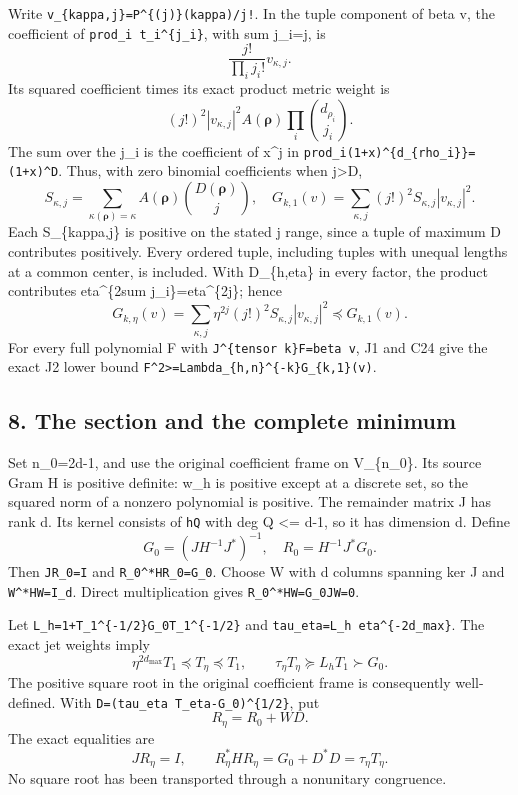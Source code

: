 Write \texttt{v\_\{kappa,j\}=P\^{}\{(j)\}(kappa)/j!}. In the tuple component of beta v, the coefficient of \texttt{prod\_i\ t\_i\^{}\{j\_i\}}, with sum j\_i=j, is \[
\frac{j!}{\prod_i j_i!}v_{\kappa,j}.
\] Its squared coefficient times its exact product metric weight is \[
(j!)^2 |v_{\kappa,j}|^2 A(\boldsymbol\rho)
 \prod_i\binom{d_{\rho_i}}{j_i}.
\] The sum over the j\_i is the coefficient of x\^{}j in \texttt{prod\_i(1+x)\^{}\{d\_\{rho\_i\}\}=(1+x)\^{}D}. Thus, with zero binomial coefficients when j\textgreater D, \[
S_{\kappa,j}=\sum_{\kappa(\boldsymbol\rho)=\kappa}
A(\boldsymbol\rho)\binom{D(\boldsymbol\rho)}j,
\quad
G_{k,1}(v)=\sum_{\kappa,j}(j!)^2S_{\kappa,j}|v_{\kappa,j}|^2.
\tag{C24}
\] Each S\_\{kappa,j\} is positive on the stated j range, since a tuple of maximum D contributes positively. Every ordered tuple, including tuples with unequal lengths at a common center, is included. With D\_\{h,eta\} in every factor, the product contributes eta\^{}\{2sum j\_i\}=eta\^{}\{2j\}; hence \[
G_{k,\eta}(v)=\sum_{\kappa,j}\eta^{2j}(j!)^2S_{\kappa,j}|v_{\kappa,j}|^2
\preceq G_{k,1}(v).
\tag{C25}
\] For every full polynomial F with \texttt{J\^{}\{tensor\ k\}F=beta\ v}, J1 and C24 give the exact J2 lower bound \texttt{\textbar{}\textbar{}F\textbar{}\textbar{}\^{}2\textgreater{}=Lambda\_\{h,n\}\^{}\{-k\}G\_\{k,1\}(v)}.

\subsection{8. The section and the complete minimum}\label{mrcoerc:the-section-and-the-complete-minimum}

Set n\_0=2d-1, and use the original coefficient frame on V\_\{n\_0\}. Its source Gram H is positive definite: w\_h is positive except at a discrete set, so the squared norm of a nonzero polynomial is positive. The remainder matrix J has rank d. Its kernel consists of \texttt{hQ} with deg Q \textless= d-1, so it has dimension d. Define \[
G_0=(JH^{-1}J^*)^{-1},\quad R_0=H^{-1}J^*G_0.
\] Then \texttt{JR\_0=I} and \texttt{R\_0\^{}*HR\_0=G\_0}. Choose W with d columns spanning ker J and \texttt{W\^{}*HW=I\_d}. Direct multiplication gives \texttt{R\_0\^{}*HW=G\_0JW=0}.

Let \texttt{L\_h=1+\textbar{}\textbar{}T\_1\^{}\{-1/2\}G\_0T\_1\^{}\{-1/2\}\textbar{}\textbar{}} and \texttt{tau\_eta=L\_h\ eta\^{}\{-2d\_max\}}. The exact jet weights imply \[
\eta^{2d_{\max}}T_1\preceq T_\eta\preceq T_1,
\qquad \tau_\eta T_\eta\succeq L_hT_1\succ G_0.
\] The positive square root in the original coefficient frame is consequently well-defined. With \texttt{D=(tau\_eta\ T\_eta-G\_0)\^{}\{1/2\}}, put \[
R_\eta=R_0+WD.
\] The exact equalities are \[
JR_\eta=I,\qquad R_\eta^*HR_\eta
=G_0+D^*D=\tau_\eta T_\eta.
\tag{C26}
\] No square root has been transported through a nonunitary congruence.

